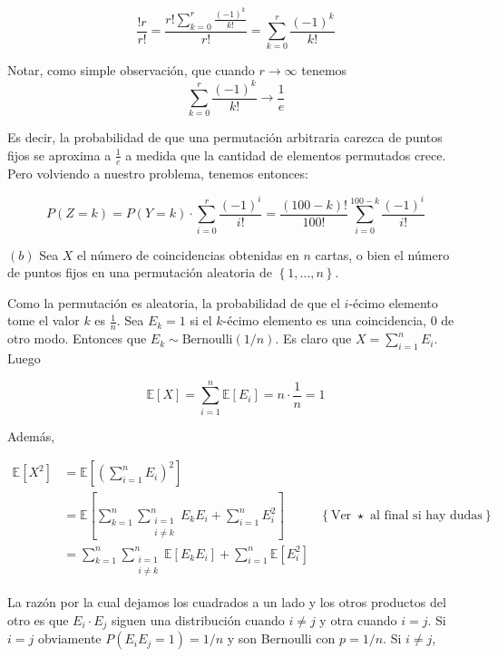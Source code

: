 \documentclass[a4paper, 12pt]{article}
\begin{document}
\begin{equation*}
  \frac{!r}{r!} = \frac{r! \sum_{k=0}^r \frac{(-1)^k}{k!}}{r!} = \sum_{k=0}^r
  \frac{(-1)^k}{k!}
\end{equation*}

Notar, como simple observación, que cuando $r \to \infty$ tenemos
$$\sum_{k=0}^r \frac{(-1)^k}{k!} \to \frac{1}{e}$$

Es decir, la probabilidad de que una permutación arbitraria carezca de puntos
fijos se aproxima a $\frac{1}{e}$ a medida que la cantidad de elementos
permutados crece. Pero volviendo a nuestro problema, tenemos entonces:

\begin{equation*}
  P(Z = k) = P(Y = k) \cdot \sum_{i=0}^r \frac{(-1)^i}{i!} =
  \frac{(100-k)!}{100!} \sum_{i=0}^{100 - k} \frac{(-1)^i}{i!}
\end{equation*}

$(b)$ Sea $X$ el número de coincidencias obtenidas en $n$ cartas, o bien el
número de puntos fijos en una permutación aleatoria de $\left\{ 1,
\ldots, n \right\} $.

Como la permutación es aleatoria, la probabilidad de que el $i$-écimo elemento
tome el valor $k$ es $\frac{1}{n}$. Sea $E_k = 1$ si el $k$-écimo elemento es
una coincidencia, $0$ de otro modo. Entonces que $E_k \sim
\text{Bernoulli}( 1 / n)$. Es claro que $X = \sum_{i=1}^n E_i$. Luego 

\begin{equation*}
  \mathbb{E}\left[ X \right] = \sum_{i=1}^n \mathbb{E}\left[ E_i \right] =
  n \cdot \frac{1}{n} = 1
\end{equation*}

Además,

\begin{align*}
  \mathbb{E}\left[ X^2 \right]  
  &= \mathbb{E}\left[ \left( \sum_{i=1}^n E_i
  \right)^2  \right] \\ 
  &= \mathbb{E}\left[ \sum_{k=1}^n\sum_{\substack{i=1\\i \neq k}}^n E_kE_i  +  \sum_{i=1}^n
E^2_{i}  \right] &\left\{ \text{Ver } \star \text{ al final si hay dudas} \right\} 
  \\ 
  &= \sum_{k=1}^n\sum_{\substack{i=1\\i \neq k}}^n \mathbb{E}\left[ E_k E_i \right] +
  \sum_{i=1}^n \mathbb{E}\left[ E_i^2 \right] 
\end{align*}

La razón por la cual dejamos los cuadrados a un lado y los otros productos del
otro es que $E_{i} \cdot E_j$ siguen una distribución cuando $i \neq j$ y otra
cuando $i = j$. Si $i = j$ obviamente $P(E_i E_j = 1) = 1 / n$ y son Bernoulli
con $p = 1 / n$. Si $i \neq j$,
\end{document}
